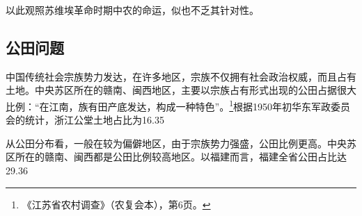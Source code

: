 以此观照苏维埃革命时期中农的命运，似也不乏其针对性。

\subsection{公田问题}


中国传统社会宗族势力发达，在许多地区，宗族不仅拥有社会政治权威，而且占有土地。中央苏区所在的赣南、闽西地区，主要以宗族占有形式出现的公田占据很大比例：“在江南，族有田产底发达，构成一种特色”。\footnote{《江苏省农村调查》（农复会本），第6页。}根据1950年初华东军政委员会的统计，浙江公堂土地占比为16.35%


从公田分布看，一般在较为偏僻地区，由于宗族势力强盛，公田比例更高。中央苏区所在的赣南、闽西都是公田比例较高地区。以福建而言，福建全省公田占比达29.36%


